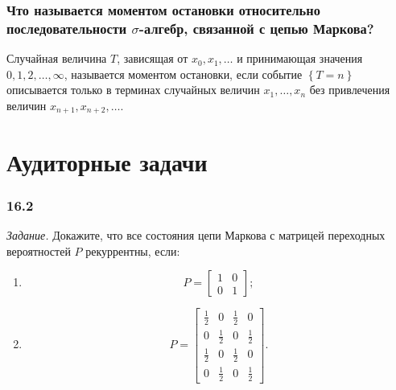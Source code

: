 \subsubsection*{Что называется моментом остановки относительно
                последовательности $ \sigma $-алгебр,
                связанной с цепью Маркова?}

Случайная величина $T$, зависящая от $x_0, x_1, \dotsc $ и принимающая значения
$0, 1, 2, \dotsc, \infty $, называется моментом остановки,
если событие $ \left\{ T = n \right\} $
описывается только в терминах случайных величин $x_1, \dotsc, x_n$
без привлечения величин $x_{n + 1}, x_{n + 2}, \dotsc $.

\section*{Аудиторные задачи}

\subsubsection*{16.2}

\textit{Задание.}
Докажите, что все состояния цепи Маркова с матрицей переходных вероятностей $P$
рекуррентны, если:
\begin{enumerate}[label=\alph*)]
  \item \begin{equation*}
    P =
    \begin{bmatrix}
      1 & 0 \\
      0 & 1
    \end{bmatrix};
  \end{equation*}
  \item \begin{equation*}
    P =
    \begin{bmatrix}
      \frac{1}{2} & 0 & \frac{1}{2} & 0 \\
      0 & \frac{1}{2} & 0 & \frac{1}{2} \\
      \frac{1}{2} & 0 & \frac{1}{2} & 0 \\
      0 & \frac{1}{2} & 0 & \frac{1}{2}
    \end{bmatrix}.
  \end{equation*}
\end{enumerate}

